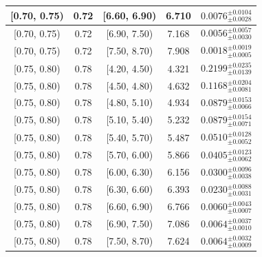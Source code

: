 \begin{longtable}{|c|c|c|c|c|}
\hline
[0.70, 0.75) & 0.72 & [6.60, 6.90) & 6.710 & $0.0076^{ \pm 0.0104 }_{ \pm 0.0028 }$ \\ 
\hline
[0.70, 0.75) & 0.72 & [6.90, 7.50) & 7.168 & $0.0056^{ \pm 0.0057 }_{ \pm 0.0030 }$ \\ 
\hline
[0.70, 0.75) & 0.72 & [7.50, 8.70) & 7.908 & $0.0018^{ \pm 0.0019 }_{ \pm 0.0005 }$ \\ 
\hline
[0.75, 0.80) & 0.78 & [4.20, 4.50) & 4.321 & $0.2199^{ \pm 0.0235 }_{ \pm 0.0139 }$ \\ 
\hline
[0.75, 0.80) & 0.78 & [4.50, 4.80) & 4.632 & $0.1168^{ \pm 0.0204 }_{ \pm 0.0081 }$ \\ 
\hline
[0.75, 0.80) & 0.78 & [4.80, 5.10) & 4.934 & $0.0879^{ \pm 0.0153 }_{ \pm 0.0066 }$ \\ 
\hline
[0.75, 0.80) & 0.78 & [5.10, 5.40) & 5.232 & $0.0879^{ \pm 0.0154 }_{ \pm 0.0071 }$ \\ 
\hline
[0.75, 0.80) & 0.78 & [5.40, 5.70) & 5.487 & $0.0510^{ \pm 0.0128 }_{ \pm 0.0052 }$ \\ 
\hline
[0.75, 0.80) & 0.78 & [5.70, 6.00) & 5.866 & $0.0405^{ \pm 0.0123 }_{ \pm 0.0062 }$ \\ 
\hline
[0.75, 0.80) & 0.78 & [6.00, 6.30) & 6.156 & $0.0300^{ \pm 0.0096 }_{ \pm 0.0038 }$ \\ 
\hline
[0.75, 0.80) & 0.78 & [6.30, 6.60) & 6.393 & $0.0230^{ \pm 0.0088 }_{ \pm 0.0031 }$ \\ 
\hline
[0.75, 0.80) & 0.78 & [6.60, 6.90) & 6.766 & $0.0060^{ \pm 0.0043 }_{ \pm 0.0007 }$ \\ 
\hline
[0.75, 0.80) & 0.78 & [6.90, 7.50) & 7.086 & $0.0064^{ \pm 0.0037 }_{ \pm 0.0010 }$ \\ 
\hline
[0.75, 0.80) & 0.78 & [7.50, 8.70) & 7.624 & $0.0064^{ \pm 0.0032 }_{ \pm 0.0009 }$ \\ 
\hline
\end{longtable}
\endgroup
